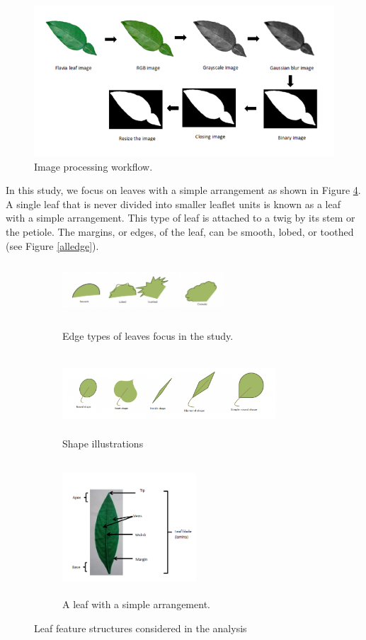 \documentclass{article}
\begin{document}
\begin{figure}[!ht]
{\centering \includegraphics[width=0.5\linewidth]{Figures/fl5.png} 

}

\caption{\label{fig:test2}Image processing workflow.}\label{fig:unnamed-chunk-2}
\end{figure}

In this study, we focus on leaves with a simple arrangement as shown
in Figure \ref{simplearra}. A single leaf that is never divided into
smaller leaflet units is known as a leaf with a simple arrangement. This
type of leaf is attached to a twig by its stem or the petiole. The
margins, or edges, of the leaf, can be smooth, lobed, or toothed (see
Figure \ref{alledge}).

\begin{figure}[!ht]
\begin{subfigure}{.5\textwidth}
\centering
\includegraphics[width=60mm, height=20mm]{Figures/alledge.png}
        \caption{\label{alledge} Edge types of leaves focus in the study.}
\centering
        \includegraphics[width=80mm, height=30mm]{Figures/imgshape.png}
        \caption{\label{shapeimg}Shape illustrations}       
        
\end{subfigure} 
\begin{subfigure}{.5\textwidth}
\centering
        \includegraphics[width=50mm, height=50mm]{leaffeatures/simple_leaf_parts.png}
        \caption{\label{simplearra} A leaf with a simple arrangement.}
        
\end{subfigure} 

\caption{Leaf feature structures considered in the analysis}
        \end{figure}
\end{document}
